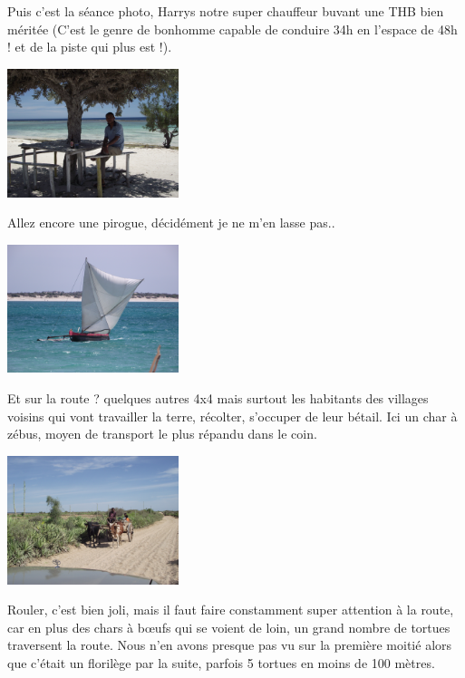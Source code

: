 \begin{multicols}{2}
Puis c'est la séance photo, Harrys notre super chauffeur buvant une THB bien méritée (C'est le genre de bonhomme capable de conduire 34h en l'espace de 48h ! et de la piste qui plus est !).

\smallbreak\smallbreak
\hspace*{-0.65cm}
\includegraphics[width=5cm]{articles/Chemins-du-sud/DSCF0321.JPG}
\smallbreak

Allez encore une pirogue, décidément je ne m'en lasse pas..

\smallbreak\smallbreak
\hspace*{-0.65cm}
\includegraphics[width=5cm]{articles/Chemins-du-sud/DSCF0338.JPG}
\smallbreak

Et sur la route ? quelques autres 4x4 mais surtout les habitants des villages voisins qui vont travailler la terre, récolter, s'occuper de leur bétail. Ici un char à zébus, moyen de transport le plus répandu dans le coin.

\smallbreak\smallbreak
\hspace*{-0.65cm}
\includegraphics[width=5cm]{articles/Chemins-du-sud/DSCF0344.JPG}
\smallbreak

Rouler, c'est bien joli, mais il faut faire constamment super attention à la route, car en plus des chars à bœufs qui se voient de loin, un grand nombre de tortues traversent la route. Nous n'en avons presque pas vu sur la première moitié alors que c'était un florilège par la suite, parfois 5 tortues en moins de 100 mètres.


\end{multicols}
